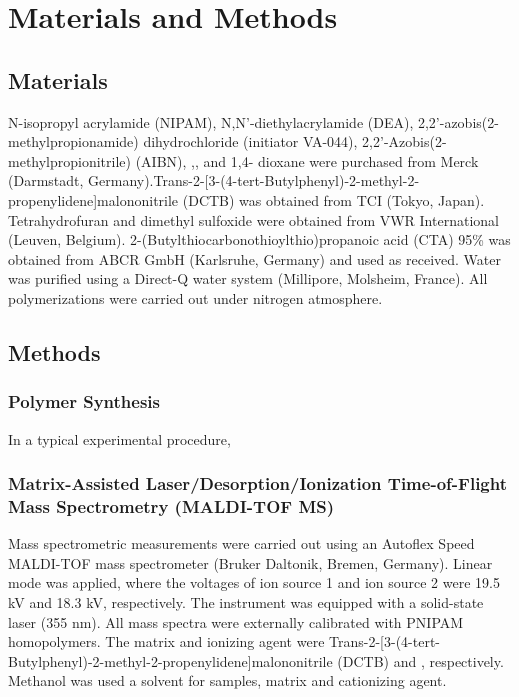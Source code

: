 \chapter{Materials and Methods}
\label{chapter3}
\ifpdf
    \graphicspath{{Chapter3/Figs/Raster/}{Chapter3/Figs/PDF/}{Chapter3/Figs/}}
\else
    \graphicspath{{Chapter3/Figs/Vector/}{Chapter3/Figs/}}
\fi


\section{Materials}
N-isopropyl acrylamide (NIPAM), N,N'-diethylacrylamide (DEA), 2,2'-azobis(2-methylpropionamide) dihydrochloride (initiator VA-044), 2,2'-Azobis(2-methylpropionitrile) (AIBN), ,, and 1,4- dioxane were purchased from Merck (Darmstadt, Germany).Trans-2-[3-(4-tert-Butylphenyl)-2-methyl-2-propenylidene]malononitrile (DCTB) was obtained from TCI (Tokyo, Japan). Tetrahydrofuran and dimethyl sulfoxide were obtained from VWR International (Leuven, Belgium). 2-(Butylthiocarbonothioylthio)propanoic acid (CTA) 95\% was obtained from ABCR GmbH (Karlsruhe, Germany) and used as received. Water was purified using a Direct-Q water system (Millipore, Molsheim, France). All polymerizations were carried out under nitrogen atmosphere.

\section{Methods}
\subsection{Polymer Synthesis}
In a typical experimental procedure, 

\subsection{Matrix-Assisted Laser/Desorption/Ionization Time-of-Flight Mass Spectrometry (MALDI-TOF MS)}
Mass spectrometric measurements were carried out using an Autoflex Speed MALDI-TOF mass spectrometer (Bruker Daltonik, Bremen, Germany). Linear mode was applied, where the voltages of ion source 1 and ion source 2 were 19.5 kV and 18.3 kV, respectively. The instrument was equipped with a solid-state laser (355 nm). All mass spectra were externally calibrated with PNIPAM homopolymers. The matrix and ionizing agent were Trans-2-[3-(4-tert-Butylphenyl)-2-methyl-2-propenylidene]malononitrile (DCTB) and , respectively. Methanol was used a solvent for samples, matrix and cationizing agent. 

